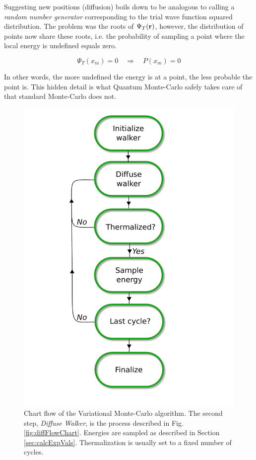 Suggesting new positions (diffusion) boils down to be analogous to calling a \textit{random number generator} corresponding to the trial wave function squared distribution. The problem was the roots of $\Psi_T(\mathbf{r})$, however, the distribution of points now share these roots, i.e. the probability of sampling a point where the local energy is undefined equals zero. 

\begin{equation}
 \Psi_T(x_m) = 0 \quad\Longrightarrow\quad P(x_m) = 0
\end{equation}

In other words, the more undefined the energy is at a point, the less probable the point is. This hidden detail is what  Quantum Monte-Carlo safely takes care of that standard Monte-Carlo does not. 

\begin{figure}
 \begin{center}
  \includegraphics[scale=0.65]{../Graphics/VMCUML.pdf}
  \caption{Chart flow of the Variational Monte-Carlo algorithm. The second step, \textit{Diffuse Walker}, is the process described in Fig. \ref{fig:diffFlowChart}. Energies are sampled as described in Section \ref{sec:calcExpVals}. Thermalization is usually set to a fixed number of cycles. }
  \label{fig:VMCchart}
 \end{center}
\end{figure}
\clearpage

